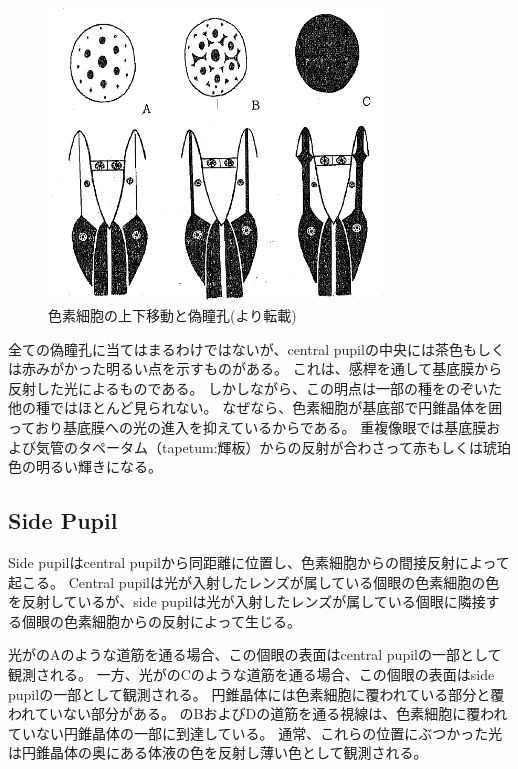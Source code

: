 \begin{figure}[htn]
  \centering
  \includegraphics[width=3.5in]{./img/yagi4-3types.png}
  \caption{色素細胞の上下移動と偽瞳孔(\cite{yagi1958studies}より転載)}
  \label{FYagi4-3types}
\end{figure}

全ての偽瞳孔に当てはまるわけではないが、central pupilの中央には茶色もしくは赤みがかった明るい点を示すものがある。
これは、感桿を通して基底膜から反射した光によるものである。
しかしながら、この明点は一部の種をのぞいた他の種ではほとんど見られない。
なぜなら、色素細胞が基底部で円錐晶体を囲っており基底膜への光の進入を抑えているからである。
重複像眼では基底膜および気管のタペータム（tapetum:輝板）からの反射が合わさって赤もしくは琥珀色の明るい輝きになる。

\subsection{Side Pupil}
\label{SSSidePupil}

Side pupilはcentral pupilから同距離に位置し、色素細胞からの間接反射によって起こる。
Central pupilは光が入射したレンズが属している個眼の色素細胞の色を反射しているが、side pupilは光が入射したレンズが属している個眼に隣接する個眼の色素細胞からの反射によって生じる\cite{yagi1951studies}。

光がのAのような道筋を通る場合、この個眼の表面はcentral pupilの一部として観測される。
一方、光がのCのような道筋を通る場合、この個眼の表面はside pupilの一部として観測される。
円錐晶体には色素細胞に覆われている部分と覆われていない部分がある。
のBおよびDの道筋を通る視線は、色素細胞に覆われていない円錐晶体の一部に到達している。
通常、これらの位置にぶつかった光は円錐晶体の奥にある体液の色を反射し薄い色として観測される。

